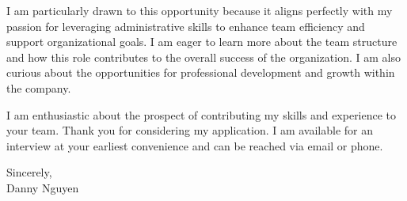 \documentclass[letterpaper,11pt]{article}
\begin{document}
\vspace{10pt}
I am particularly drawn to this opportunity because it aligns perfectly with my passion for leveraging administrative skills to enhance team efficiency and support organizational goals. I am eager to learn more about the team structure and how this role contributes to the overall success of the organization. I am also curious about the opportunities for professional development and growth within the company.

\vspace{20pt}
I am enthusiastic about the prospect of contributing my skills and experience to your team. Thank you for considering my application. I am available for an interview at your earliest convenience and can be reached via email or phone.

Sincerely, \\
\vspace{40pt} %
Danny Nguyen

\end{document}
